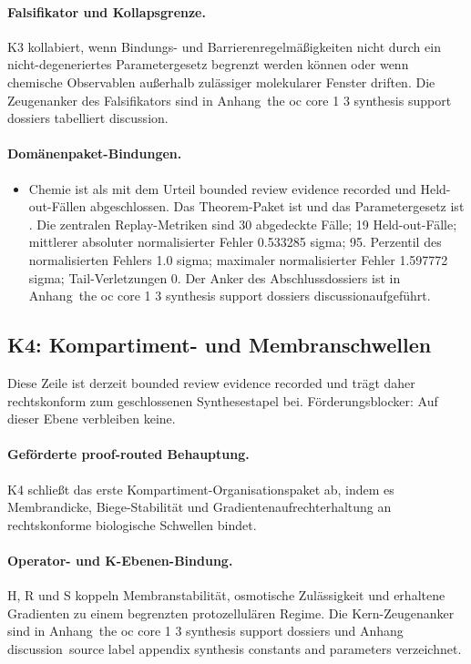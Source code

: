 \paragraph{Falsifikator und Kollapsgrenze.}
K3 kollabiert, wenn Bindungs- und Barrierenregelmäßigkeiten nicht durch ein nicht-degeneriertes Parametergesetz begrenzt werden können oder wenn chemische Observablen außerhalb zulässiger molekularer Fenster driften.
Die Zeugenanker des Falsifikators sind in Anhang~the oc core 1 3 synthesis support dossiers tabelliert discussion.

\paragraph{Domänenpaket-Bindungen.}
\begin{itemize}[leftmargin=1.6em,nosep]
\item Chemie ist als  mit dem Urteil bounded review evidence recorded und  Held-out-Fällen abgeschlossen. Das Theorem-Paket ist  und das Parametergesetz ist . Die zentralen Replay-Metriken sind 30 abgedeckte Fälle; 19 Held-out-Fälle; mittlerer absoluter normalisierter Fehler 0.533285 sigma; 95. Perzentil des normalisierten Fehlers 1.0 sigma; maximaler normalisierter Fehler 1.597772 sigma; Tail-Verletzungen 0. Der Anker des Abschlussdossiers ist in Anhang~the oc core 1 3 synthesis support dossiers discussionaufgeführt.
\end{itemize}

\subsection{K4: Kompartiment- und Membranschwellen}
\label{sec:oc-core-1-3-synthesis-k4}
Diese Zeile ist derzeit bounded review evidence recorded und trägt daher rechtskonform zum geschlossenen Synthesestapel bei.
Förderungsblocker: Auf dieser Ebene verbleiben keine.

\paragraph{Geförderte proof-routed Behauptung.}
K4 schließt das erste Kompartiment-Organisationspaket ab, indem es Membrandicke, Biege-Stabilität und Gradientenaufrechterhaltung an rechtskonforme biologische Schwellen bindet.

\paragraph{Operator- und K-Ebenen-Bindung.}
H, R und S koppeln Membranstabilität, osmotische Zulässigkeit und erhaltene Gradienten zu einem begrenzten protozellulären Regime.
Die Kern-Zeugenanker sind in Anhang~the oc core 1 3 synthesis support dossiers und Anhang discussion~source label appendix synthesis constants and parameters verzeichnet.

